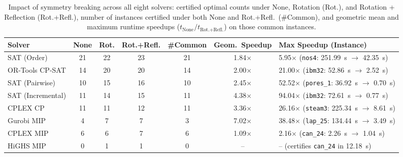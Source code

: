 \documentclass[a4paper,fleqn]{cas-sc}
\begin{document}
\begin{table}[pos=htbp]
\centering
\caption{Impact of symmetry breaking across all eight solvers: certified optimal counts under None, Rotation (Rot.), and Rotation + Reflection (Rot.+Refl.), number of instances certified under both None and Rot.+Refl.\ (\#Common), and geometric mean and maximum runtime speedups ($t_{\text{None}}/t_{\text{Rot.+Refl.}}$) on those common instances.}
\label{tab:symmetry_speedup}
\scriptsize
\begin{tabular*}{\textwidth}{@{\extracolsep{\fill}}lcccccl@{}}
\toprule
\textbf{Solver} & \textbf{None} & \textbf{Rot.} & \textbf{Rot.+Refl.} & \textbf{\#Common} & \textbf{Geom.\ Speedup} & \textbf{Max Speedup (Instance)} \\
\midrule
SAT (Order) & 21 & 22 & 23 & 21 & 1.84$\times$ & 5.95$\times$ (\texttt{nos4}: 251.99~s $\to$ 42.35~s) \\
OR-Tools CP-SAT & 14 & 20 & 20 & 14 & 2.00$\times$ & 21.00$\times$ (\texttt{ibm32}: 52.86~s $\to$ 2.52~s) \\
SAT (Pairwise) & 10 & 15 & 16 & 10 & 2.45$\times$ & 52.52$\times$ (\texttt{pores\_1}: 36.92~s $\to$ 0.70~s) \\
SAT (Incremental) & 11 & 14 & 15 & 11 & 4.38$\times$ & 94.04$\times$ (\texttt{ibm32}: 72.61~s $\to$ 0.77~s) \\
CPLEX CP & 11 & 11 & 12 & 11 & 3.36$\times$ & 26.16$\times$ (\texttt{steam3}: 225.34~s $\to$ 8.61~s) \\
Gurobi MIP & 4 & 7 & 7 & 3 & 7.02$\times$ & 38.48$\times$ (\texttt{lap\_25}: 134.44~s $\to$ 3.49~s) \\
CPLEX MIP & 6 & 6 & 7 & 6 & 1.09$\times$ & 2.16$\times$ (\texttt{can\_24}: 2.26~s $\to$ 1.04~s) \\
HiGHS MIP & 0 & 1 & 1 & 0 & -- & -- (certifies \texttt{can\_24} in 12.18~s) \\
\bottomrule
\end{tabular*}
\end{table}
\end{document}
